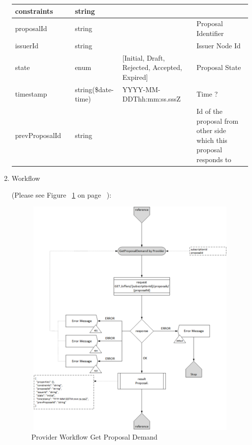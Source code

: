 \begin{enumerate}
\begin{center}
\begin{tabular}{|p{3cm}|l|p{3cm}|p{3cm}|p{4cm}|}
\hline

constraints &	&	string				&								&	\\

\hline

proposalId	&	&	string				&								& Proposal Identifier \\

\hline

issuerId	&	&	string				&								& Issuer Node Id \\

\hline

state		&	&	enum				& [Initial, Draft, Rejected, Accepted, Expired] & Proposal State \\

\hline

timestamp	& 	& 	string(\$date-time)	&	YYYY-MM-DDThh:mm:ss.sssZ	&	Time ? \\ 

\hline

prevProposalId & &	string 				&								&	Id of the proposal from other side which this proposal responds to \\

\hline

\end{tabular}
\end{center}


\item Workflow

(Please see Figure ~\ref{fig:GPD} on page ~\pageref{fig:GPD}):

\begin{figure}[htbp]
    \centering
    \includegraphics[width=12cm,height=12cm,angle=0]{./diag/Workflow/Market/GetProposalDemand-P-Workflow.png}
    \caption{Provider Workflow Get Proposal Demand }
	\label{fig:GPD}
\end{figure}


\end{enumerate}

